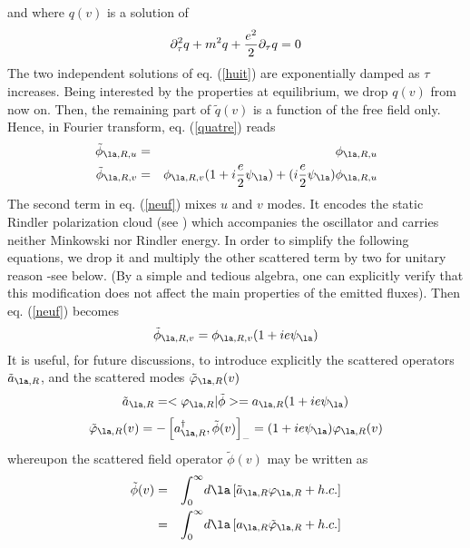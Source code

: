 \documentclass[12pt]{article}
\begin{document}
and where $q(v)$ is a solution of
\begin{equation}
\partial_{ \tau} ^2 q +  m ^2 q + {e^2  \over 2} \partial_{
\tau}q = 0
\label{huit}
\end{equation}
The two independent solutions of  eq. (\ref{huit}) are exponentially
damped as $ \tau$
increases. Being interested by the properties at equilibrium, we drop
$q(v)$ from now on. Then, the remaining part of $ \tilde q(v)$ is a function
of the free field only. Hence, in Fourier transform, eq. (\ref{quatre})
reads
\begin{eqnarray}
\tilde  \phi _{ \la,R,u} &=&  \phi _{ \la,R,u}
\nonumber\\
\tilde  \phi _{ \la,R,v} &=&  \phi _{ \la,R,v} (1+ i{e\over 2} \psi _{ \la})+
(i{e\over 2} \psi _{ \la})  \phi _{
\la,R,u}
\label{neuf}
\end{eqnarray}
The second term in eq. (\ref{neuf}) mixes $u$ and $v$ modes. It encodes the
static Rindler polarization cloud (see \cite{Unru2} \cite{mpbrsg})
which accompanies the
oscillator and carries
neither
Minkowski nor Rindler energy. In order to simplify the following
equations, we drop it and multiply the other scattered term by two
for unitary reason -see
below. (By a simple and tedious algebra, one can
explicitly verify that this modification does not
affect the main properties
of the emitted fluxes). Then  eq. (\ref{neuf}) becomes
\begin{equation}
\tilde  \phi _{ \la,R,v} =  \phi _{ \la,R,v} (1+ ie\psi _{ \la})
\label{dix}
\end{equation}
It is useful, for future discussions, to introduce explicitly the
scattered operators  $\tilde a_{\la,R}$,
and the scattered modes $\tilde \varphi_{\la,R} (v)$
\begin{equation}
\tilde a_{\la,R} =  < \varphi_{\la,R} |  \tilde  \phi > =
a_{\la,R}(1+ ie\psi _{ \la})
\label{onze}
\end{equation}
\begin{equation}
\tilde \varphi_{\la,R} (v) =- \left[  a_{\la,R}^\dagger,  \tilde  \phi
(v)
\right]_- = (1+ ie\psi _{ \la}) \varphi_{\la,R} (v)
\label{douze}
\end{equation}
whereupon the scattered field operator $\tilde \phi (v)$ may be written as
\begin{eqnarray}
\tilde \phi (v)  &=& \int_0^{\infty}\! d\la  \left[ \tilde a_{\la,R}
\varphi_{\la,R} + h.c.  \right]
\nonumber\\  &=& \int_0^{\infty}\! d\la
\left[ a_{\la,R} \tilde \varphi_{\la,R} +  h.c. \right]
\label{treize}
\end{eqnarray}
\end{document}
